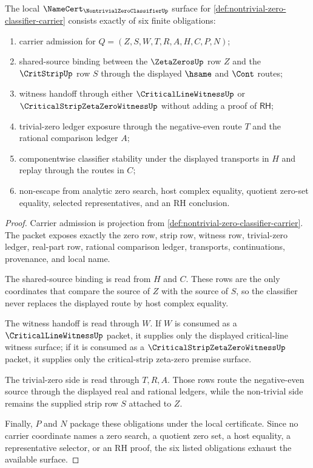\begin{theorem}
\label{thm:nontrivial-zero-classifier-namecert-obligations}
The local $\NameCert_{\NontrivialZeroClassifierUp}$ surface for \autoref{def:nontrivial-zero-classifier-carrier} consists exactly of six finite obligations:
\begin{enumerate}
\item carrier admission for $Q=(Z,S,W,T,R,A,H,C,P,N)$;
\item shared-source binding between the $\ZetaZerosUp$ row $Z$ and the $\CritStripUp$ row $S$ through the displayed $\hsame$ and $\Cont$ routes;
\item witness handoff through either $\CriticalLineWitnessUp$ or $\CriticalStripZetaZeroWitnessUp$ without adding a proof of $\mathsf{RH}$;
\item trivial-zero ledger exposure through the negative-even route $T$ and the rational comparison ledger $A$;
\item componentwise classifier stability under the displayed transports in $H$ and replay through the routes in $C$;
\item non-escape from analytic zero search, host complex equality, quotient zero-set equality, selected representatives, and an RH conclusion.
\end{enumerate}
\end{theorem}
\begin{proof}
Carrier admission is projection from \autoref{def:nontrivial-zero-classifier-carrier}. The packet exposes exactly the zero row, strip row, witness row, trivial-zero ledger, real-part row, rational comparison ledger, transports, continuations, provenance, and local name.

The shared-source binding is read from $H$ and $C$. These rows are the only coordinates that compare the source of $Z$ with the source of $S$, so the classifier never replaces the displayed route by host complex equality.

The witness handoff is read through $W$. If $W$ is consumed as a $\CriticalLineWitnessUp$ packet, it supplies only the displayed critical-line witness surface; if it is consumed as a $\CriticalStripZetaZeroWitnessUp$ packet, it supplies only the critical-strip zeta-zero premise surface.

The trivial-zero side is read through $T,R,A$. Those rows route the negative-even source through the displayed real and rational ledgers, while the non-trivial side remains the supplied strip row $S$ attached to $Z$.

Finally, $P$ and $N$ package these obligations under the local certificate. Since no carrier coordinate names a zero search, a quotient zero set, a host equality, a representative selector, or an RH proof, the six listed obligations exhaust the available surface.
\end{proof}

